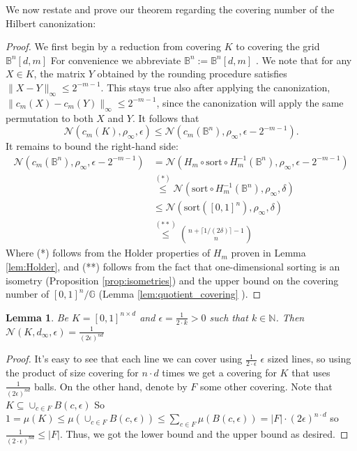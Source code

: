 \documentclass{article}
\theoremstyle{definition}
\theoremstyle{plain}
\newtheorem{lemma}[definition]{Lemma}
\newcommand{\G}{\mathbb{G}}
\newcommand{\N}{\mathcal{N}}
\newcommand{\bbN}{\mathbb{N}}
\begin{document}
We now restate and prove our theorem regarding the covering number of the Hilbert canonization:


\hilbert*
\begin{proof}
We first begin by a reduction from covering $K$ to covering the grid $\mathbb{B}^n[d,m] $ For convenience we abbreviate $\mathbb{B}^n:=\mathbb{B}^n[d,m] $ . We note that for any  $X \in K$, the matrix $Y$ obtained by the rounding procedure satisfies $\|X-Y\|_\infty\leq 2^{-m-1} $. This stays true also after applying the canonization,  $\|c_m(X)-c_m(Y)\|_\infty\leq 2^{-m-1} $, since the canonization will apply the same permutation to both $X$ and $Y$. It follows that 
$$\N\left(c_m\left(K \right),\rho_\infty,\epsilon \right)\leq \N\left(c_m\left(\mathbb{B}^n\right),\rho_\infty,\epsilon-2^{-m-1} \right) .$$
It remains to bound the right-hand side:
\begin{align*}
 \N\left(c_m\left(\mathbb{B}^n\right),\rho_\infty,\epsilon-2^{-m-1} \right)&=\N\left(H_m \circ \mathrm{sort} \circ H_m^{-1}\left(\mathbb{B}^n\right),\rho_\infty,\epsilon-2^{-m-1} \right) \\
 &\stackrel{(*)}{\leq} \N\left( \mathrm{sort} \circ H_m^{-1}\left(\mathbb{B}^n\right),\rho_\infty,\delta \right)\\
 &\leq \N\left( \mathrm{sort} \left( [0,1]^n \right),\rho_\infty,\delta \right)\\
 &\stackrel{(**)}{\leq}  \binom{n+\lceil 1/ (2\delta) \rceil-1}{n}
\end{align*}
Where (*) follows from the Holder properties of $H_m$ proven in
Lemma \ref{lem:Holder}, and (**) follows from the fact that one-dimensional sorting is an isometry (Proposition \ref{prop:isometries}) and the upper bound on the covering number of $[0,1]^n/\G$ (Lemma \ref{lem:quotient_covering} ).
\end{proof}
\begin{lemma}
    \label{covering_cube}
    Be $K = [0,1]^{n \times d}$ and $\epsilon=\frac{1}{2\cdot k}>0$ such that $k\in \bbN$. Then $\N(K,d_{\infty},\epsilon)=\frac{1}{(2\epsilon)^{nd}}$
\end{lemma}
\begin{proof}
    It's easy to see that each line we can cover using $\frac{1}{2\cdot \epsilon}$ $\epsilon$ sized lines, so using the product of size covering for $n \cdot d$ times we get a covering for $K$ that uses $\frac{1}{(2\epsilon)^{nd}}$ balls.
    On the other hand, denote by $F$ some other covering. 
    Note that $K \subseteq \cup_{c \in F} B(c, \epsilon)$
   So $1=\mu(K)\leq \mu(\cup_{c \in F} B(c, \epsilon))\leq \sum_{c \in F} \mu(B(c, \epsilon))=|F|\cdot (2\epsilon)^{n \cdot d}$ so $\frac{1}{(2\cdot \epsilon)^{nd}}\leq |F|$. 
   Thus, we got the lower bound and the upper bound as desired.
\end{proof}
\end{document}
